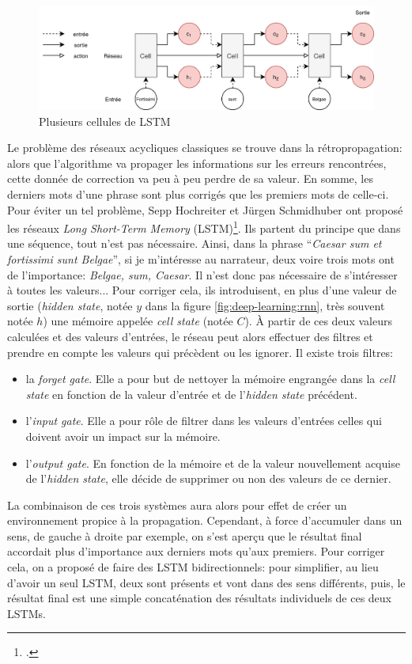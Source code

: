 \begin{figure}[h]
    \centering
    \includegraphics[width=\linewidth]{figures/chap2/LSTM-Zoom-Out.png}
    \caption{Plusieurs cellules de LSTM}
    \label{fig:deep-learning:lstm}
\end{figure}

Le problème des réseaux acycliques classiques se trouve dans la rétropropagation: alors que l'algorithme va propager les informations sur les erreurs rencontrées, cette donnée de correction va peu à peu perdre de sa valeur. En somme, les derniers mots d'une phrase sont plus corrigés que les premiers mots de celle-ci. Pour éviter un tel problème, Sepp Hochreiter et Jürgen Schmidhuber ont proposé les réseaux \textit{Long Short-Term Memory} (LSTM)\footcite{hochreiter_long_1997}. Ils partent du principe que dans une séquence, tout n'est pas nécessaire. Ainsi, dans la phrase \enquote{\textit{Caesar sum et fortissimi sunt Belgae}}, si je m'intéresse au narrateur, deux voire trois mots ont de l'importance: \textit{Belgae, sum, Caesar}. Il n'est donc pas nécessaire de s'intéresser à toutes les valeurs... Pour corriger cela, ils introduisent, en plus d'une valeur de sortie (\textit{hidden state}, notée $y$ dans la figure \ref{fig:deep-learning:rnn}, très souvent notée $h$) une mémoire appelée \textit{cell state} (notée $C$). À partir de ces deux valeurs calculées et des valeurs d'entrées, le réseau peut alors effectuer des filtres et prendre en compte les valeurs qui précèdent ou les ignorer. Il existe trois filtres:
\begin{itemize}
    \item la \textit{forget gate}. Elle a pour but de nettoyer la mémoire engrangée dans la \textit{cell state} en fonction de la valeur d'entrée et de l'\textit{hidden state} précédent. 
    \item l'\textit{input gate}. Elle a pour rôle de filtrer dans les valeurs d'entrées celles qui doivent avoir un impact sur la mémoire.
    \item l'\textit{output gate}. En fonction de la mémoire et de la valeur nouvellement acquise de l'\textit{hidden state}, elle décide de supprimer ou non des valeurs de ce dernier.
\end{itemize}
La combinaison de ces trois systèmes aura alors pour effet de créer un environnement propice à la propagation. Cependant, à force d'accumuler dans un sens, de gauche à droite par exemple, on s'est aperçu que le résultat final accordait plus d'importance aux derniers mots qu'aux premiers. Pour corriger cela, on a proposé de faire des LSTM bidirectionnels: pour simplifier, au lieu d'avoir un seul LSTM, deux sont présents et vont dans des sens différents, puis, le résultat final est une simple concaténation des résultats individuels de ces deux LSTMs.

